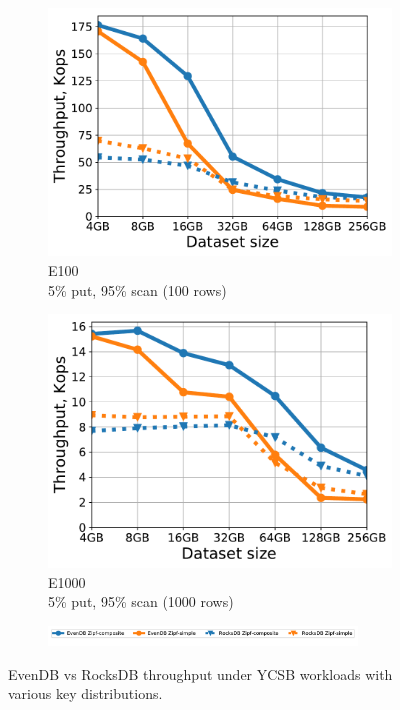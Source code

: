 \documentclass[sigplan,10pt]{acmart}
\newcommand{\sys}{EvenDB}
\begin{document}
\begin{figure}[tb]
\begin{subfigure}{0.32\linewidth}
\includegraphics[width=\textwidth]{figs/Workload_E_line.pdf}
\caption{E100 \\ 5\% put, 95\% scan (100 rows)}
\label{fig:throughput:e100}
\end{subfigure}
\begin{subfigure}{0.32\linewidth}
\includegraphics[width=\textwidth]{figs/Workload_E+_line.pdf}
\caption{E1000 \\5\% put, 95\% scan (1000 rows)}
\label{fig:throughput:e1000}
\end{subfigure}
\begin{subfigure}{\linewidth}
\centerline{
\includegraphics[width=0.9\textwidth]{figs/legend.pdf}
\vspace{-5mm}
}
\end{subfigure}
\caption{
{\sys\/ vs RocksDB throughput under YCSB workloads with various key distributions.}
}
\label{fig:throughput}
\end{figure}
\end{document}
